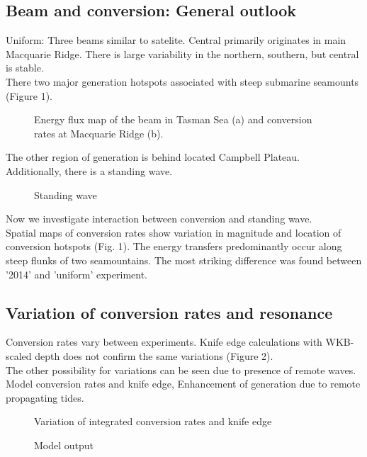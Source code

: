 \subsection{Beam and conversion: General outlook}
Uniform: Three beams similar to satelite. Central primarily originates in main Macquarie Ridge. There is large  variability in the northern, southern, but central is stable.\\
There two major generation hotspots associated with steep submarine seamounts (Figure 1).\\
\begin{figure}
\caption{Energy flux map of the beam in Tasman Sea (a) and conversion rates at Macquarie Ridge (b).}
\end{figure}
The other region of generation is behind located Campbell Plateau.\\
Additionally, there is a standing wave.
\begin{figure}
\caption{Standing wave}
\end{figure}
Now we investigate interaction between conversion and standing wave.\\
Spatial maps of conversion rates show variation in magnitude and location of conversion hotspots (Fig. 1). The energy transfers predominantly occur along steep flunks of two seamountains. The most striking difference was found between '2014' and 'uniform' experiment.\\

\subsection{Variation of conversion rates and resonance}
Conversion rates vary between experiments. Knife edge calculations with WKB-scaled depth does not confirm the same variations (Figure 2).\\
The other possibility for variations can be seen due to presence of remote waves.
Model conversion rates and knife edge, Enhancement of generation due to remote propagating tides.\\
\begin{figure}
\caption{Variation of integrated conversion rates and knife edge}
\end{figure}

\begin{figure}
\caption{Model output}
\end{figure}

